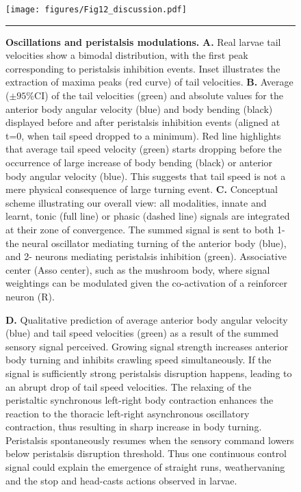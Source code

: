 \documentclass[11pt,a4paper]{article}
\begin{document}
\begin{figure}
\begin{center}
\texttt{[image: figures/Fig12\_discussion.pdf]}
\caption{{\bf Oscillations and peristalsis modulations.} {\bf A.} Real larvae tail velocities show a bimodal distribution, with the first peak corresponding to peristalsis inhibition events. Inset illustrates the extraction of maxima peaks (red curve) of tail velocities.
{\bf B.} Average ($\pm 95\%$CI) of the tail velocities (green) and absolute values for the anterior body angular velocity (blue) and body bending (black) displayed before and after peristalsis inhibition events (aligned at t=0, when tail speed dropped to a minimum). Red line highlights that average tail speed velocity (green) starts dropping before the occurrence of large increase of body bending (black) or anterior body angular velocity (blue). This suggests that tail speed is not a mere physical consequence of large turning event.
{\bf C.} Conceptual scheme illustrating our overall view: all modalities, innate and learnt, tonic (full line) or phasic (dashed line) signals are integrated at their zone of convergence. The summed signal is sent to both 1-the  neural oscillator mediating turning of the anterior body (blue), and 2- neurons mediating peristalsis inhibition (green).  Associative center (Asso center), such as the mushroom body, where signal weightings can be modulated given the co-activation of a reinforcer neuron (R).
\label{fig:Peristalsis}}
\hrule
\end{center}
\end{figure}


\begin{figure}
\ContinuedFloat
\caption{
{\bf D.} Qualitative prediction of average anterior body angular velocity (blue) and tail speed velocities (green) as a result of the summed sensory signal perceived. Growing signal strength increases anterior body turning and inhibits crawling speed simultaneously. If the signal is sufficiently strong peristalsis disruption happens, leading to an abrupt drop of tail speed velocities. The relaxing of the  peristaltic synchronous left-right body contraction enhances the reaction to the thoracic left-right asynchronous oscillatory contraction, thus resulting in sharp increase in body turning. Peristalsis spontaneously resumes when the sensory command lowers below peristalsis disruption threshold. Thus one continuous control signal could explain the emergence of straight runs, weathervaning and the stop and head-casts actions observed in larvae.
}
\end{figure}





\clearpage


\end{document}

